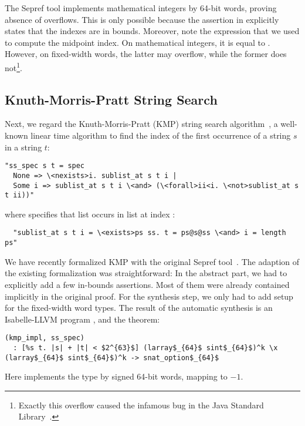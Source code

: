 \documentclass[a4paper,USenglish,cleveref, autoref]{lipics-v2019}
\begin{document}
The Sepref tool implements mathematical integers by 64-bit words, proving absence of overflows.
This is only possible because the assertion in  explicitly states that the indexes are in bounds. 
Moreover, note the expression  that we used to compute the midpoint index. 
On mathematical integers, it is equal to . However, on fixed-width words, the latter may overflow, while the former does not\footnote{Exactly this 
overflow caused the infamous bug in the Java Standard Library~\cite{bs_flaw_blogpost}.}.

\subsection{Knuth-Morris-Pratt String Search}
Next, we regard the Knuth-Morris-Pratt (KMP) string search algorithm~\cite{KMP77}, a well-known 
linear time algorithm to find the index of the first occurrence of a string $s$ in a string $t$:
\begin{lstlisting}
"ss_spec s t = spec
  None => \<nexists>i. sublist_at s t i |
  Some i => sublist_at s t i \<and> (\<forall>ii<i. \<not>sublist_at s t ii))"
\end{lstlisting}
where  specifies that list  occurs in list  at index :
\begin{lstlisting}
  "sublist_at s t i = \<exists>ps ss. t = ps@s@ss \<and> i = length ps"
\end{lstlisting}


We have recently formalized KMP with the original Sepref tool~\cite{HeLa17}.
The adaption of the existing formalization was straightforward: 
In the abstract part, we had to explicitly add a few in-bounds assertions. Most of them were already contained implicitly in the original proof.
For the synthesis step, we only had to add setup for the fixed-width word types.
The result of the automatic synthesis is an Isabelle-LLVM program , and the theorem:
\begin{lstlisting}
(kmp_impl, ss_spec)
  : [%s t. |s| + |t| < $2^{63}$] (larray$_{64}$ sint$_{64}$)^k \x (larray$_{64}$ sint$_{64}$)^k -> snat_option$_{64}$
\end{lstlisting}
Here  implements the type  by signed 64-bit words, mapping  to $-1$.
\end{document}

